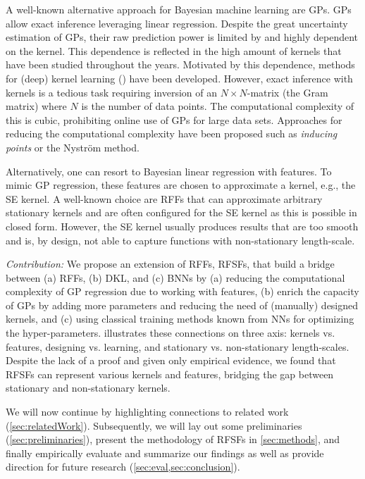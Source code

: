 
A well-known alternative approach for Bayesian machine learning are \acp{GP}.
\aclp{GP} allow exact inference leveraging linear regression.
Despite the great uncertainty estimation of \acp{GP}, their raw prediction power is limited by and highly dependent on the kernel.
This dependence is reflected in the high amount of kernels that have been studied throughout the years\cite[ch.\,2]{duvenaudAutomaticModelConstruction2014}.
Motivated by this dependence, methods for (deep) kernel learning () have been developed\cite{wilsonDeepKernelLearning2016,calandraManifoldGaussianProcesses2016,jacotNeuralTangentKernel2020}.
However, exact inference with kernels is a tedious task requiring inversion of an \(N \times N\)-matrix (the Gram matrix) where \(N\) is the number of data points.
The computational complexity of this is cubic, prohibiting online use of \acp{GP} for large data sets\cite{rahimiRandomFeaturesLargeScale2007}.
Approaches for reducing the computational complexity have been proposed such as \emph{inducing points}\cite{snelsonSparseGaussianProcesses2005} or the Nyström method\cite{nystromUberPraktischeAuflosung1930,sunReviewNystromMethods2015}.

Alternatively, one can resort to Bayesian linear regression with features.
To mimic \ac{GP} regression, these features are chosen to approximate a kernel, e.g., the \ac{SE} kernel.
A well-known choice are \acp{RFF} that can approximate arbitrary stationary kernels and are often configured for the \ac{SE} kernel as this is possible in closed form\cite{rahimiRandomFeaturesLargeScale2007}.
However, the \ac{SE} kernel usually produces results that are too smooth\cite{steinInterpolationSpatialData1999} and is, by design, not able to capture functions with non-stationary length-scale.

\emph{Contribution:} We propose an extension of \acp{RFF}, \acp{RFSF}, that build a bridge between (a) \acp{RFF}, (b) \ac{DKL}, and (c) \acp{BNN} by (a) reducing the computational complexity of \ac{GP} regression due to working with features, (b) enrich the capacity of \acp{GP} by adding more parameters and reducing the need of (manually) designed kernels, and (c) using classical training methods known from \acp{NN} for optimizing the hyper-parameters.
 illustrates these connections on three axis: kernels vs. features, designing vs. learning, and stationary vs. non-stationary length-scales.
Despite the lack of a proof and given only empirical evidence, we found that \acp{RFSF} can represent various kernels and features, bridging the gap between stationary and non-stationary kernels.

We will now continue by highlighting connections to related work (\cref{sec:relatedWork}).
Subsequently, we will lay out some preliminaries (\cref{sec:preliminaries}), present the methodology of \acp{RFSF} in \cref{sec:methods}, and finally empirically evaluate and summarize our findings as well as provide direction for future research (\cref{sec:eval,sec:conclusion}).
